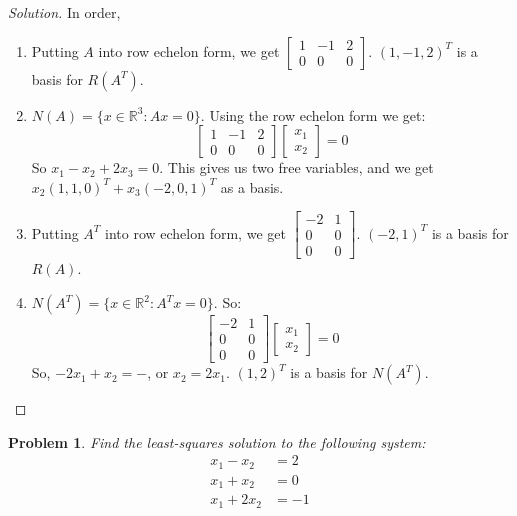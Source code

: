 \documentclass{article}
\theoremstyle{mystyle}
\newtheorem{problem}{Problem}[section]
\begin{document}
\begin{proof}[Solution]
In order,
\begin{enumerate}
    \item Putting $A$ into row echelon form, we get $\begin{bmatrix} 1 & -1 & 2 \\ 0 & 0 & 0 \end{bmatrix}$. $(1,-1,2)^T$ is a basis for $R(A^{T})$.
    \item $N(A) = \{x\in \mathbb{R}^3: Ax = 0\}$. Using the row echelon form we get:
    \begin{equation*}
        \begin{bmatrix} 1 & -1 & 2 \\ 0 & 0 & 0 \end{bmatrix} \begin{bmatrix} x_1 \\ x_2 \end{bmatrix} = 0
    \end{equation*}
    So $x_1 - x_2 + 2x_3 = 0$. This gives us two free variables, and we get $x_2(1,1,0)^T + x_3(-2,0,1)^T$ as a basis.
    \item Putting $A^T$ into row echelon form, we get $\begin{bmatrix} -2 & 1 \\ 0 & 0 \\ 0 & 0 \end{bmatrix}$. $(-2,1)^T$ is a basis for $R(A)$.
    \item $N(A^T) = \{x\in \mathbb{R}^2: A^T x = 0\}$. So:
    \begin{equation*}
        \begin{bmatrix} -2 & 1 \\ 0 & 0 \\ 0 & 0 \end{bmatrix} \begin{bmatrix} x_1 \\ x_2 \end{bmatrix} = 0    
    \end{equation*}
    So, $-2x_1 + x_2 = -$, or $x_2 = 2x_1$. $(1,2)^T$ is a basis for $N(A^{T})$.
\end{enumerate}
\end{proof}
\begin{problem}
Find the least-squares solution to the following system:
\begin{align*}
    x_1 - x_2 &=2\\
    x_1 + x_2 &= 0\\
    x_1 + 2x_2 &=-1
\end{align*}
\end{problem}
\end{document}
